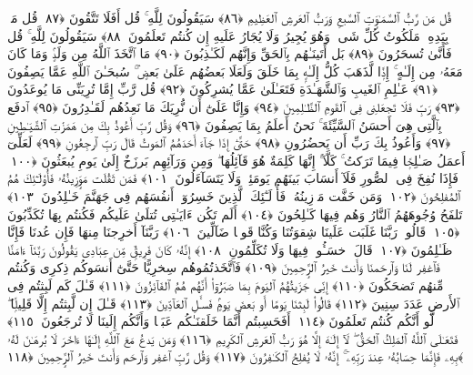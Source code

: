  قُل مَن رَّبُّ ٱلسَّمَـٰوَٟتِ ٱلسَّبعِ وَرَبُّ ٱلعَرشِ ٱلعَظِيمِ ﴿٨٦﴾
 سَيَقُولُونَ لِلَّهِ ۚ قُل أَفَلَا تَتَّقُونَ ﴿٨٧﴾
 قُل مَنۢ بِيَدِهِۦ مَلَكُوتُ كُلِّ شَىءٍۢ وَهُوَ يُجِيرُ وَلَا يُجَارُ عَلَيهِ إِن كُنتُم تَعلَمُونَ ﴿٨٨﴾
 سَيَقُولُونَ لِلَّهِ ۚ قُل فَأَنَّىٰ تُسحَرُونَ ﴿٨٩﴾
 بَل أَتَينَـٰهُم بِٱلحَقِّ وَإِنَّهُم لَكَـٰذِبُونَ ﴿٩٠﴾
 مَا ٱتَّخَذَ ٱللَّهُ مِن وَلَدٍۢ وَمَا كَانَ مَعَهُۥ مِن إِلَـٰهٍ ۚ إِذًۭا لَّذَهَبَ كُلُّ إِلَـٰهٍۭ بِمَا خَلَقَ وَلَعَلَا بَعضُهُم عَلَىٰ بَعضٍۢ ۚ سُبحَـٰنَ ٱللَّهِ عَمَّا يَصِفُونَ ﴿٩١﴾
 عَـٰلِمِ ٱلغَيبِ وَٱلشَّهَـٰدَةِ فَتَعَـٰلَىٰ عَمَّا يُشرِكُونَ ﴿٩٢﴾
 قُل رَّبِّ إِمَّا تُرِيَنِّى مَا يُوعَدُونَ ﴿٩٣﴾
 رَبِّ فَلَا تَجعَلنِى فِى ٱلقَومِ ٱلظَّـٰلِمِينَ ﴿٩٤﴾
 وَإِنَّا عَلَىٰٓ أَن نُّرِيَكَ مَا نَعِدُهُم لَقَـٰدِرُونَ ﴿٩٥﴾
 ٱدفَع بِٱلَّتِى هِىَ أَحسَنُ ٱلسَّيِّئَةَ ۚ نَحنُ أَعلَمُ بِمَا يَصِفُونَ ﴿٩٦﴾
 وَقُل رَّبِّ أَعُوذُ بِكَ مِن هَمَزَٰتِ ٱلشَّيَـٰطِينِ ﴿٩٧﴾
 وَأَعُوذُ بِكَ رَبِّ أَن يَحضُرُونِ ﴿٩٨﴾
 حَتَّىٰٓ إِذَا جَآءَ أَحَدَهُمُ ٱلمَوتُ قَالَ رَبِّ ٱرجِعُونِ ﴿٩٩﴾
 لَعَلِّىٓ أَعمَلُ صَـٰلِحًۭا فِيمَا تَرَكتُ ۚ كَلَّآ ۚ إِنَّهَا كَلِمَةٌ هُوَ قَآئِلُهَا ۖ وَمِن وَرَآئِهِم بَرزَخٌ إِلَىٰ يَومِ يُبعَثُونَ ﴿١٠٠﴾
 فَإِذَا نُفِخَ فِى ٱلصُّورِ فَلَآ أَنسَابَ بَينَهُم يَومَئِذٍۢ وَلَا يَتَسَآءَلُونَ ﴿١٠١﴾
 فَمَن ثَقُلَت مَوَٟزِينُهُۥ فَأُو۟لَـٰٓئِكَ هُمُ ٱلمُفلِحُونَ ﴿١٠٢﴾
 وَمَن خَفَّت مَوَٟزِينُهُۥ فَأُو۟لَـٰٓئِكَ ٱلَّذِينَ خَسِرُوٓا۟ أَنفُسَهُم فِى جَهَنَّمَ خَـٰلِدُونَ ﴿١٠٣﴾
 تَلفَحُ وُجُوهَهُمُ ٱلنَّارُ وَهُم فِيهَا كَـٰلِحُونَ ﴿١٠٤﴾
 أَلَم تَكُن ءَايَـٰتِى تُتلَىٰ عَلَيكُم فَكُنتُم بِهَا تُكَذِّبُونَ ﴿١٠٥﴾
 قَالُوا۟ رَبَّنَا غَلَبَت عَلَينَا شِقوَتُنَا وَكُنَّا قَومًۭا ضَآلِّينَ ﴿١٠٦﴾
 رَبَّنَآ أَخرِجنَا مِنهَا فَإِن عُدنَا فَإِنَّا ظَـٰلِمُونَ ﴿١٠٧﴾
 قَالَ ٱخسَـُٔوا۟ فِيهَا وَلَا تُكَلِّمُونِ ﴿١٠٨﴾
 إِنَّهُۥ كَانَ فَرِيقٌۭ مِّن عِبَادِى يَقُولُونَ رَبَّنَآ ءَامَنَّا فَٱغفِر لَنَا وَٱرحَمنَا وَأَنتَ خَيرُ ٱلرَّٟحِمِينَ ﴿١٠٩﴾
 فَٱتَّخَذتُمُوهُم سِخرِيًّا حَتَّىٰٓ أَنسَوكُم ذِكرِى وَكُنتُم مِّنهُم تَضحَكُونَ ﴿١١٠﴾
 إِنِّى جَزَيتُهُمُ ٱليَومَ بِمَا صَبَرُوٓا۟ أَنَّهُم هُمُ ٱلفَآئِزُونَ ﴿١١١﴾
 قَـٰلَ كَم لَبِثتُم فِى ٱلأَرضِ عَدَدَ سِنِينَ ﴿١١٢﴾
 قَالُوا۟ لَبِثنَا يَومًا أَو بَعضَ يَومٍۢ فَسـَٔلِ ٱلعَآدِّينَ ﴿١١٣﴾
 قَـٰلَ إِن لَّبِثتُم إِلَّا قَلِيلًۭا ۖ لَّو أَنَّكُم كُنتُم تَعلَمُونَ ﴿١١٤﴾
 أَفَحَسِبتُم أَنَّمَا خَلَقنَـٰكُم عَبَثًۭا وَأَنَّكُم إِلَينَا لَا تُرجَعُونَ ﴿١١٥﴾
 فَتَعَـٰلَى ٱللَّهُ ٱلمَلِكُ ٱلحَقُّ ۖ لَآ إِلَـٰهَ إِلَّا هُوَ رَبُّ ٱلعَرشِ ٱلكَرِيمِ ﴿١١٦﴾
 وَمَن يَدعُ مَعَ ٱللَّهِ إِلَـٰهًا ءَاخَرَ لَا بُرهَـٰنَ لَهُۥ بِهِۦ فَإِنَّمَا حِسَابُهُۥ عِندَ رَبِّهِۦٓ ۚ إِنَّهُۥ لَا يُفلِحُ ٱلكَـٰفِرُونَ ﴿١١٧﴾
 وَقُل رَّبِّ ٱغفِر وَٱرحَم وَأَنتَ خَيرُ ٱلرَّٟحِمِينَ ﴿١١٨﴾
 
